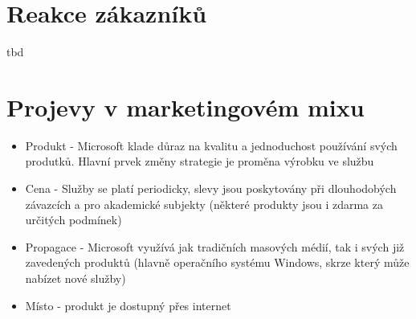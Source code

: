 \documentclass{article}
\begin{document}
\section{Reakce zákazníků}
tbd

\section{Projevy v marketingovém mixu}
\begin{itemize}
    \item Produkt - Microsoft klade důraz na kvalitu a jednoduchost používání svých produtků. Hlavní prvek změny strategie je proměna výrobku ve službu
    \item Cena - Služby se platí periodicky, slevy jsou poskytovány při dlouhodobých závazcích a pro akademické subjekty (některé produkty jsou i zdarma za určitých podmínek)
    \item Propagace - Microsoft využívá jak tradičních masových médií, tak i svých již zavedených produktů (hlavně operačního systému Windows, skrze který může nabízet nové služby)
    \item Místo - produkt je dostupný přes internet
\end{itemize}
\end{document}
